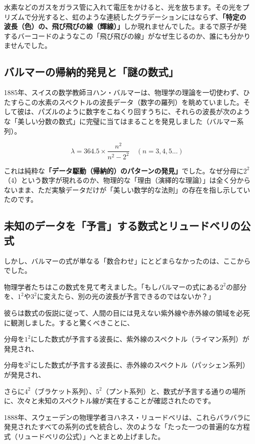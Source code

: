 水素などのガスをガラス管に入れて電圧をかけると、光を放ちます。その光をプリズムで分光すると、虹のような連続したグラデーションにはならず、\textbf{「特定の波長（色）の、飛び飛びの線（輝線）」}しか現れませんでした。まるで原子が発するバーコードのようなこの「飛び飛びの線」がなぜ生じるのか、誰にも分かりませんでした。

\subsection{バルマーの帰納的発見と「謎の数式」}

1885年、スイスの数学教師ヨハン・バルマーは、物理学の理論を一切使わず、ひたすらこの水素のスペクトルの波長データ（数字の羅列）を眺めていました。そして彼は、パズルのように数字をこねくり回すうちに、それらの波長が次のような「美しい分数の数式」に完璧に当てはまることを発見しました（バルマー系列）。

\[\lambda = 364.5 \times \frac{n^2}{n^2 - 2^2} \quad (n = 3, 4, 5 \dots)\]

これは純粋な\textbf{「データ駆動（帰納的）のパターンの発見」}でした。なぜ分母に\(2^2\)（4）という数字が現れるのか、物理的な「理由（演繹的な理論）」は全く分からないまま、ただ実験データだけが「美しい数学的な法則」の存在を指し示していたのです。

\subsection{未知のデータを「予言」する数式とリュードベリの公式}

しかし、バルマーの式が単なる「数合わせ」にとどまらなかったのは、ここからでした。

物理学者たちはこの数式を見て考えました。「もしバルマーの式にある\(2^2\)の部分を、\(1^2\)や\(3^2\)に変えたら、別の光の波長が予言できるのではないか？」

彼らは数式の仮説に従って、人間の目には見えない紫外線や赤外線の領域を必死に観測しました。すると驚くべきことに、

分母を\(1^2\)にした数式が予言する波長に、紫外線のスペクトル（ライマン系列）が発見され、

分母を\(3^2\)にした数式が予言する波長に、赤外線のスペクトル（パッシェン系列）が発見され、

さらに\(4^2\)（ブラケット系列）、\(5^2\)（プント系列）と、数式が予言する通りの場所に、次々と未知のスペクトル線が実在することが確認されたのです。

1888年、スウェーデンの物理学者ヨハネス・リュードベリは、これらバラバラに発見されたすべての系列の式を統合し、次のような「たった一つの普遍的な方程式（リュードベリの公式）」へとまとめ上げました。

